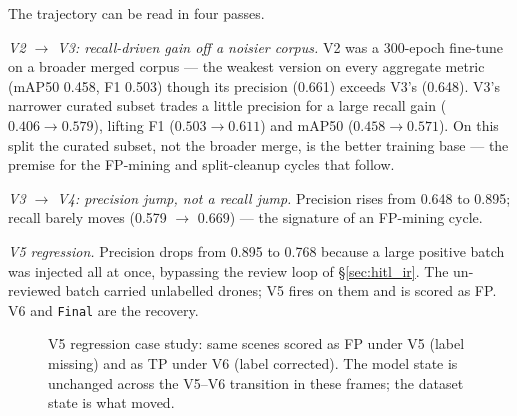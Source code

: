 The trajectory can be read in four passes.

\emph{V2 $\to$ V3: recall-driven gain off a noisier corpus.} V2 was a 300-epoch fine-tune on a broader merged corpus --- the weakest version on every aggregate metric (mAP50 0.458, F1 0.503) though its precision (0.661) exceeds V3's (0.648). V3's narrower curated subset trades a little precision for a large recall gain ($0.406 \to 0.579$), lifting F1 ($0.503 \to 0.611$) and mAP50 ($0.458 \to 0.571$). On this split the curated subset, not the broader merge, is the better training base --- the premise for the FP-mining and split-cleanup cycles that follow.

\emph{V3 $\to$ V4: precision jump, not a recall jump.} Precision rises from 0.648 to 0.895; recall barely moves (0.579 $\to$ 0.669) --- the signature of an FP-mining cycle.

\emph{V5 regression.} Precision drops from 0.895 to 0.768 because a large positive batch was injected all at once, bypassing the review loop of \S\ref{sec:hitl_ir}. The un-reviewed batch carried unlabelled drones; V5 fires on them and is scored as FP. V6 and \texttt{Final} are the recovery.

\begin{figure}[htbp]
    \centering
    \caption{V5 regression case study: same scenes scored as FP under V5 (label missing) and as TP under V6 (label corrected). The model state is unchanged across the V5--V6 transition in these frames; the dataset state is what moved.}
    \label{fig:v5_regression}
\end{figure}

